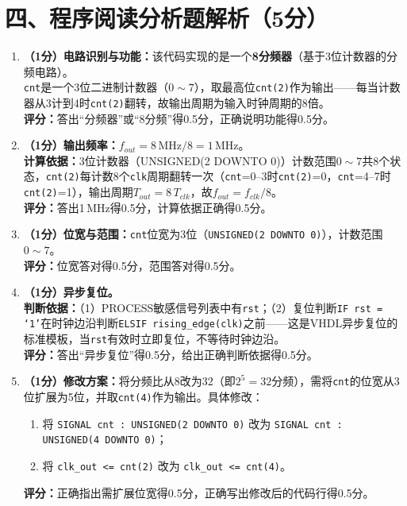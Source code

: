 \section{四、程序阅读分析题解析（5分）}

\begin{enumerate}[label=(\arabic*)]

\item \textbf{（1分）电路识别与功能：}该代码实现的是一个\textbf{8分频器}（基于3位计数器的分频电路）。\\
\texttt{cnt}是一个3位二进制计数器（$0\sim7$），取最高位\texttt{cnt(2)}作为输出——每当计数器从3计到4时\texttt{cnt(2)}翻转，故输出周期为输入时钟周期的8倍。\\
\textbf{评分：}答出“分频器”或“8分频”得0.5分，正确说明功能得0.5分。

\item \textbf{（1分）输出频率：}$f_{out}=8\,\text{MHz}/8=1\,\text{MHz}$。\\
\textbf{计算依据：}3位计数器（UNSIGNED(2 DOWNTO 0)）计数范围$0\sim7$共8个状态，\texttt{cnt(2)}每计数8个\texttt{clk}周期翻转一次（\texttt{cnt}=0--3时\texttt{cnt(2)}=0，\texttt{cnt}=4--7时\texttt{cnt(2)}=1），输出周期$T_{out}=8\,T_{clk}$，故$f_{out}=f_{clk}/8$。\\
\textbf{评分：}答出1\,MHz得0.5分，计算依据正确得0.5分。

\item \textbf{（1分）位宽与范围：}\texttt{cnt}位宽为3位（\texttt{UNSIGNED(2 DOWNTO 0)}），计数范围$0\sim7$。\\
\textbf{评分：}位宽答对得0.5分，范围答对得0.5分。

\item \textbf{（1分）异步复位。}\\
\textbf{判断依据：}（1）PROCESS敏感信号列表中有\texttt{rst}；（2）复位判断\texttt{IF rst = `1'}在时钟边沿判断\texttt{ELSIF rising\_edge(clk)}之前——这是VHDL异步复位的标准模板，当\texttt{rst}有效时立即复位，不等待时钟边沿。\\
\textbf{评分：}答出“异步复位”得0.5分，给出正确判断依据得0.5分。

\item \textbf{（1分）修改方案：}将分频比从8改为32（即$2^5=32$分频），需将\texttt{cnt}的位宽从3位扩展为5位，并取\texttt{cnt(4)}作为输出。具体修改：
\begin{enumerate}
  \item 将 \texttt{SIGNAL cnt : UNSIGNED(2 DOWNTO 0)} 改为 \texttt{SIGNAL cnt : UNSIGNED(4 DOWNTO 0)}；
  \item 将 \texttt{clk\_out <= cnt(2)} 改为 \texttt{clk\_out <= cnt(4)}。
\end{enumerate}
\textbf{评分：}正确指出需扩展位宽得0.5分，正确写出修改后的代码行得0.5分。

\end{enumerate}

